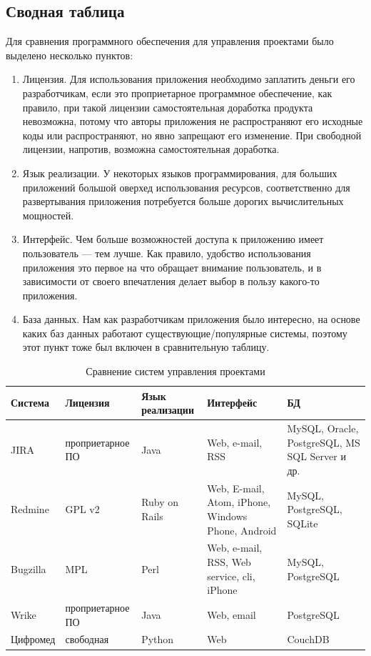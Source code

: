 \documentclass[a4paper, 14pt]{extarticle}
\begin{document}
\subsection{Сводная таблица}
Для сравнения программного обеспечения для управления проектами было выделено
несколько пунктов:
\begin{enumerate}
\item Лицензия. Для использования приложения необходимо заплатить деньги
  его разработчикам, если это проприетарное программное обеспечение, как правило,
  при такой лицензии самостоятельная доработка продукта невозможна, потому
  что авторы приложения не распространяют его исходные коды или распространяют, но
  явно запрещают его изменение. При свободной лицензии,
  напротив, возможна самостоятельная доработка.
\item Язык реализации. У некоторых языков программирования, для больших приложений
  большой оверхед использования ресурсов, соответственно для развертывания приложения
  потребуется больше дорогих вычислительных мощностей.
\item Интерфейс. Чем больше возможностей доступа к приложению имеет пользователь --- тем лучше.
  Как правило, удобство использования приложения это первое на что обращает внимание пользователь,
  и в зависимости от своего впечатления делает выбор в пользу какого-то приложения.
\item База данных. Нам как разработчикам приложения было интересно, на основе каких баз данных
  работают существующие/популярные системы, поэтому этот пункт тоже был включен в сравнительную таблицу.
\end{enumerate}

\begin{table}[!htb]
  \caption{Сравнение систем управления проектами~\cite{jira_off}~\cite{redmine_off}~\cite{bugzilla_off}~\cite{wrike_off}}
  \label{tab:cmp_pm}
  \begin{center}
    \begin{tabularx}{\textwidth}{|l|X|X|X|X|}
      \hline
      Система & Лицензия & Язык реализации & Интерфейс & БД \\
      \hline
      JIRA & проприетарное ПО & Java & Web, e-mail, RSS & MySQL, Oracle, PostgreSQL, MS SQL Server и др. \\
      \hline
      Redmine & GPL v2 & Ruby on Rails & Web, E-mail, Atom, iPhone, Windows Phone, Android & MySQL, PostgreSQL, SQLite \\
      \hline
      Bugzilla & MPL & Perl & Web, e-mail, RSS, Web service, cli, iPhone & MySQL, PostgreSQL \\
      \hline
      Wrike & проприетарное ПО & Java & Web, email & PostgreSQL \\
      \hline
      Цифромед & свободная & Python & Web & CouchDB \\
      \hline
    \end{tabularx}
  \end{center}
\end{table}
\end{document}
